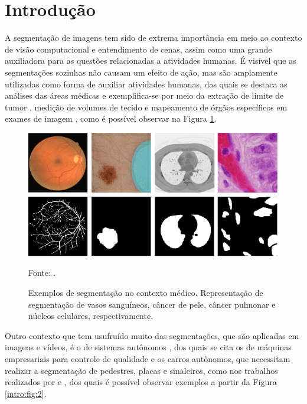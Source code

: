 \newpage
\clearpage
{}
\setcounter{page}{13}

\section{Introdução}
\label{intro:intro}

A segmentação de imagens tem sido de extrema importância em meio ao contexto de visão computacional e entendimento de cenas, assim como uma grande auxiliadora para as questões relacionadas a atividades humanas. É visível que as segmentações sozinhas não causam um efeito de ação, mas são amplamente utilizadas como forma de auxiliar atividades humanas, das quais se destaca as análises das áreas médicas \citep{Lai2015, Withey2008} e exemplifica-se por meio da extração de limite de tumor \citep{Malkanthi2017}, medição de volumes de tecido e mapeamento de órgãos específicos em exames de imagem \citep{Gibson2018, Schoppe2020}, como é possível observar na Figura \ref{intro:fig:1}.

\begin{figure}[H]
    \centering
    \caption{Exemplos de segmentação no contexto médico. Representação de segmentação de vasos sanguíneos, câncer de pele, câncer pulmonar e núcleos celulares, respectivamente.}
    \includegraphics[width=1\linewidth]{recursos/imagens/introduction/medical-image-segmentation.png}
    \label{intro:fig:1}

    Fonte: \cite{Asadi-Aghbolaghi2020}.
\end{figure}

Outro contexto que tem usufruído muito das segmentações, que são aplicadas em imagens e vídeos, é o de sistemas autônomos \citep{Kaymak2019, Liu2020, Pan2020, Teichmann2018}, dos quais se cita os de máquinas empresariais para controle de qualidade e os carros autônomos, que necessitam realizar a segmentação de pedestres, placas e sinaleiros, como nos trabalhos realizados por \cite{Lee2018, Fleyeh2004} e \cite{Pan2020}, dos quais é possível observar exemplos a partir da Figura \ref{intro:fig:2}.

